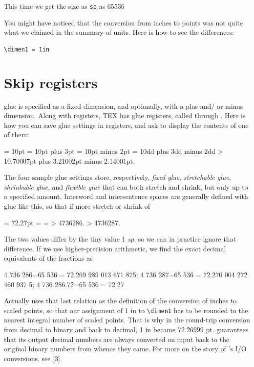 {\noindent This time we get the size as \texttt{sp} as 65536 }


You might have noticed that the conversion from inches to points was not
quite what we claimed in the summary of \tex units. Here is how to see the
differences:

\verb+\dimen1 = 1in+


\section{Skip registers}
\begin{macro}{\skip}
\tex glue is specified as a fixed dimension, and optionally, with a plus and/
or minus dimension. Along with  registers, TEX has glue registers,
called  through . Here is how you can save glue settings in
 registers, and ask \tex to display the contents of one of them:
\end{macro}

\begin{teXXX}
   = 10pt
   = 10pt plus 3pt
   = 10pt minus 2pt
   = 10dd plus 3dd minus 2dd
  \showthe {}
  > 10.70007pt plus 3.21002pt minus 2.14001pt.
\end{teXXX}


The four sample glue settings store, respectively, \textit{fixed glue}, \textit{stretchable
glue}, \textit{shrinkable glue}, and \textit{flexible glue} that can both stretch and shrink,
but only up to a specified amount. Interword and intersentence spaces are
generally defined with glue like this, so that if more stretch or shrink of

\begin{teX}
 = 72.27pt
 = 
 = 
\showthe {}
> 4736286.
\showthe {}
> 4736287.
\end{teX}

The two values differ by the tiny value 1 \textit{sp}, so we can in practice ignore
that difference. If we use higher-precision arithmetic, we find the exact
decimal equivalents of the fractions as

\begin{teX}
4 736 286=65 536 = 72.269 989 013 671 875;
4 736 287=65 536 = 72.270 004 272 460 937 5;
4 736 286.72=65 536 = 72.27
\end{teX}


Actually \tex uses that last relation as the definition of the conversion of
inches to scaled points, so that our assignment of 1 in to \verb+\dimen1+ has to
be rounded to the nearest integral number of scaled points. That is why
in the round-trip conversion from decimal to binary and back to decimal,
1 in became 72.26999 pt. \tex guarantees that its output decimal numbers
are always converted on input back to the original binary numbers from
whence they came. For more on the story of \tex’s I/O conversions, see [3].


